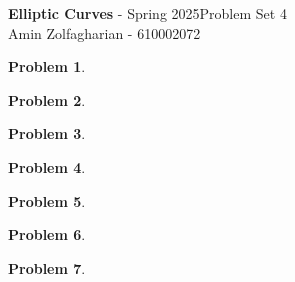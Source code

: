 \documentclass[12pt]{article}
\newcommand{\customanswer}[1]{%
\begin{problem}
\end{problem}

}
\newtheorem{problem}{Problem}
\begin{document}
\noindent \textbf{Elliptic Curves} - Spring 2025\hfill Problem Set 4\\
Amin Zolfagharian - 610002072

\hrulefill

\customanswer{1}
\customanswer{2}
\customanswer{3}
\customanswer{4}
\customanswer{5}
\customanswer{6}
\customanswer{7}
\end{document}
